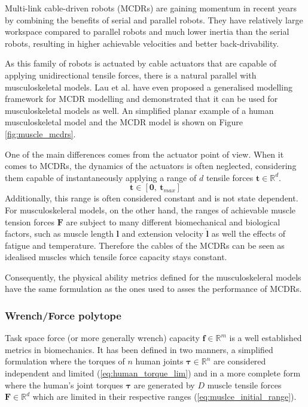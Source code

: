 Multi-link cable-driven robots (MCDRs) \cite{Wang2019} are gaining momentum in recent years by combining the benefits of serial and parallel robots. They have relatively large workspace compared to parallel robots and much lower inertia than the serial robots, resulting in higher achievable velocities and better back-drivability. 

As this family of robots is actuated by cable actuators that are capable of applying unidirectional tensile forces, there is a natural parallel with musculoskeletal models. Lau et al. \cite{Lau2013} have even proposed a generalised modelling framework for MCDR modelling and demonstrated that it can be used for musculoskeletal models as well. An simplified planar example of a human musculoskeletal model and the MCDR model is shown on Figure \ref{fig:muscle_mcdrs}.

One of the main differences comes from the actuator point of view. When it comes to MCDRs, the dynamics of the actuators is often neglected, considering them capable of instantaneously applying a range of $d$ tensile forces $\bm{t}\in\mathbb{R}^d$.
\begin{equation}
    \bm{t} \in [\bm{0},~\bm{t}_{max}]
\end{equation}
Additionally, this range is often considered constant and is not state dependent. For musculoskeleral models, on the other hand, the ranges of achievable muscle tension forces $\bm{F}$ are subject to many different biomechanical and biological factors, such as muscle length $\bm{l}$ and extension velocity $\dot{\bm{l}}$ as well the effects of fatigue and temperature.
Therefore the cables of the MCDRs can be seen as idealised muscles which tensile force capacity stays constant. 

Consequently, the physical ability metrics defined for the musculoskeleral models have the same formulation as the ones used to asses the performance of MCDRs.

\subsubsection{Wrench/Force polytope}
\label{ch:force_poly_human}
Task space force (or more generally wrench) capacity $\bm{f} \in \mathbb{R}^m$ is a well established metrics in biomechanics. It has been defined in two manners, a simplified formulation where the torques of $n$ human joints $\bm{\tau} \in \mathbb{R}^n$ are considered independent and limited (\ref{eq:human_torque_lim}) and in a more complete form where the human's joint torques $\bm{\tau}$ are generated by $D$ muscle tensile forces $\bm{F} \in \mathbb{R}^d$ which are limited in their respective ranges (\ref{eq:muslce_initial_range}).

